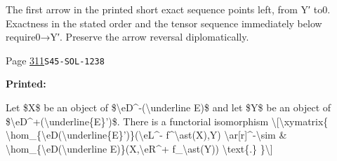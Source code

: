 \begin{description}
\par\noindent The first arrow in the printed short exact sequence points left, from Y′ to0. Exactness in the stated order and the tensor sequence immediately below require0→Y′. Preserve the arrow reversal diplomatically.
\smallskip
\item[\hypertarget{apparatus:EN-0217}{217}] Page \hyperlink{printpage:en:311}{311}\quad\texttt{S45-SOL-1238}
\par\noindent\textbf{Printed:} {\footnotesize\ttfamily\raggedright Let \$X\$ be an object of \$\textbackslash{}\allowbreak{}eD\textasciicircum{}\allowbreak{}-\allowbreak{}(\allowbreak{}\textbackslash{}\allowbreak{}underline E)\allowbreak{}\$ and let \$Y\$ be an object of \$\textbackslash{}\allowbreak{}eD\textasciicircum{}\allowbreak{}+\allowbreak{}(\allowbreak{}\textbackslash{}\allowbreak{}underline\{\allowbreak{}E\}\allowbreak{}')\allowbreak{}\$. There is a functorial isomorphism \textbackslash{}\allowbreak{}[\allowbreak{}\textbackslash{}\allowbreak{}xymatrix\{\allowbreak{}   \textbackslash{}\allowbreak{}hom\_\allowbreak{}\{\allowbreak{}\textbackslash{}\allowbreak{}eD(\allowbreak{}\textbackslash{}\allowbreak{}underline\{\allowbreak{}E\}\allowbreak{}')\allowbreak{}\}\allowbreak{}(\allowbreak{}\textbackslash{}\allowbreak{}eL\textasciicircum{}\allowbreak{}-\allowbreak{} f\textasciicircum{}\allowbreak{}\textbackslash{}\allowbreak{}ast(\allowbreak{}X)\allowbreak{},\allowbreak{}Y)\allowbreak{} \textbackslash{}\allowbreak{}ar[\allowbreak{}r]\allowbreak{}\textasciicircum{}\allowbreak{}-\allowbreak{}\textbackslash{}\allowbreak{}sim     \& \textbackslash{}\allowbreak{}hom\_\allowbreak{}\{\allowbreak{}\textbackslash{}\allowbreak{}eD(\allowbreak{}\textbackslash{}\allowbreak{}underline E)\allowbreak{}\}\allowbreak{}(\allowbreak{}X,\allowbreak{}\textbackslash{}\allowbreak{}eR\textasciicircum{}\allowbreak{}+\allowbreak{} f\_\allowbreak{}\textbackslash{}\allowbreak{}ast(\allowbreak{}Y)\allowbreak{})\allowbreak{} \textbackslash{}\allowbreak{}text\{\allowbreak{}.\}\allowbreak{} \}\allowbreak{}\textbackslash{}\allowbreak{}]\allowbreak{}}

\end{description}
